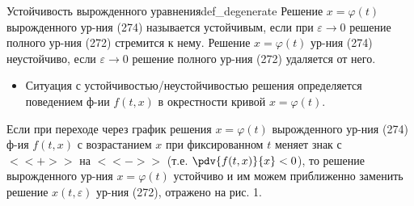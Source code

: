 \begin{definition}{Устойчивость вырожденного уравнения}{def_degenerate}
	Решение $x=\varphi(t)$ вырожденного ур-ния (274) называется устойчивым, если при $\varepsilon \to 0$ решение полного ур-ния (272) стремится к нему. Решение $x=\varphi(t)$ ур-ния (274) неустойчиво, если $\varepsilon \to 0$ решение полного ур-ния (272) удаляется от него.
\end{definition}

\begin{itemize}
	\item Ситуация с устойчивостью/неустойчивостью решения определяется поведением ф-ии $f(t,x)$ в окрестности кривой $x=\varphi(t)$.
\end{itemize}

Если при переходе через график решения $x=\varphi(t)$ вырожденного ур-ния (274) ф-ия $f(t,x)$ с возрастанием $x$ при фиксированном $t$ меняет знак с $<<+>>$ на $<<->>$ (т.е. $\pdv{f(t,x)}{x} < 0$), то решение вырожденного ур-ния $x=\varphi(t)$ устойчиво и им можем приближенно заменить решение $x(t,\varepsilon)$ ур-ния (272), отражено на рис. 1.

